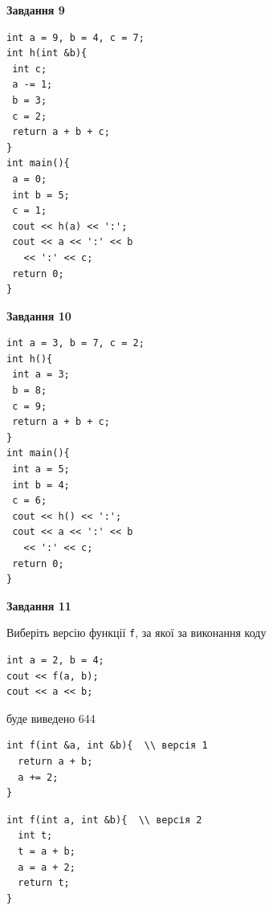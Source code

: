 \documentclass[12pt, ukrainian]{article}
\def\code#1{\Verb!#1!}
\begin{document}
{\begin {large}
\begin{minipage}[t]{11.0cm}
\end{minipage}


\begin{minipage}[t]{7.0cm}

\begin{center}
\textbf{Завдання 9}
\end{center}
\vspace{-8mm}

\begin{verbatim}
int a = 9, b = 4, c = 7;
int h(int &b){
 int c;
 a -= 1;
 b = 3;
 c = 2;
 return a + b + c;
}
int main(){
 a = 0;
 int b = 5;
 c = 1;
 cout << h(a) << ':';
 cout << a << ':' << b 
   << ':' << c;
 return 0;
}
\end{verbatim}



\begin{center}
\textbf{Завдання 10}
\end{center}
\vspace{-8mm}

\begin{verbatim}
int a = 3, b = 7, c = 2;
int h(){
 int a = 3;
 b = 8;
 c = 9;
 return a + b + c;
}
int main(){
 int a = 5;
 int b = 4;
 c = 6;
 cout << h() << ':';
 cout << a << ':' << b 
   << ':' << c;
 return 0;
}
\end{verbatim}

\end{minipage}
\vline \hspace{1mm}
\begin{minipage}[t]{11.0cm}

\begin{center}
\textbf{Завдання 11}
\end{center}
Виберіть версію функції \code{f}, за якої за виконання коду
\begin{verbatim}
int a = 2, b = 4;
cout << f(a, b);
cout << a << b;
\end{verbatim}

буде виведено 644

\begin{verbatim}
int f(int &a, int &b){  \\ версія 1
  return a + b;
  a += 2;
}
\end{verbatim}

\vspace{-8mm}\begin{verbatim}
int f(int a, int &b){  \\ версія 2
  int t;
  t = a + b;
  a = a + 2;
  return t;
}
\end{verbatim}


\end{minipage}
\end{large}}
\end{document}
